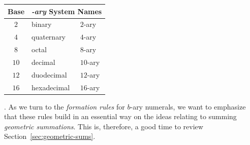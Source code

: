 \smallskip

\begin{tabular}{|c|l|l|}
\hline
{\bf Base} & \multicolumn{2}{c}{\bf {\em -ary} System Names}  \\
\hline
$2$   & binary     & $2$-ary  \\
\hline 
$4$   & quaternary & $4$-ary  \\
\hline
$8$    & octal & $8$-ary \\
\hline
$10$   & decimal & $10$-ary  \\
\hline
$12$    & duodecimal & $12$-ary  \\
\hline
$16$     & hexadecimal & $16$-ary \\
\hline
\end{tabular}

\bigskip

.
As we turn to the {\it formation rules} for $b$-ary numerals, we want
to emphasize that these rules build in an essential way on the ideas
relating to summing {\em geometric summations}.  This is, therefore, a
good time to review Section~\ref{sec:geometric-sums}.

\medskip


